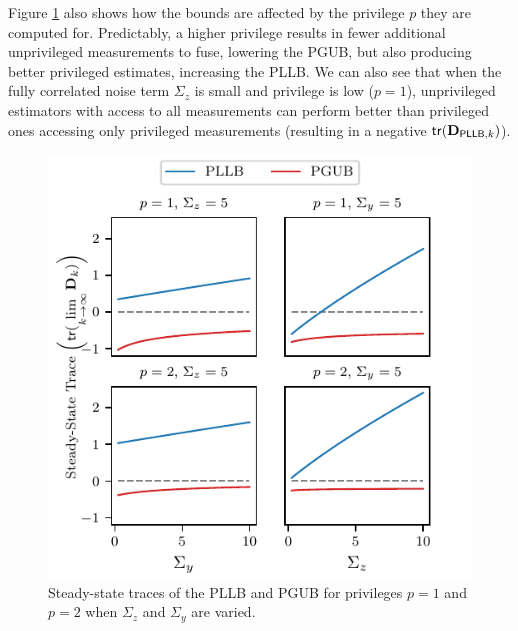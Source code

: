 Figure \ref{fig:trace_params} also shows how the bounds are affected by the privilege $p$ they are computed for. Predictably, a higher privilege results in fewer additional unprivileged measurements to fuse, lowering the PGUB, but also producing better privileged estimates, increasing the PLLB. We can also see that when the fully correlated noise term $\Sigma_z$ is small and privilege is low ($p=1$), unprivileged estimators with access to all measurements can perform better than privileged ones accessing only privileged measurements (resulting in a negative $\mathsf{tr}({{\mathbf{D}}}_{\mathsf{PLLB},k})$).
\begin{figure}[htbp]
  \centering
  \includegraphics{figures/trace_params.pdf}
  \caption{Steady-state traces of the PLLB and PGUB for privileges $p=1$ and $p=2$ when $\Sigma_z$ and $\Sigma_y$ are varied.}
  \label{fig:trace_params}
\end{figure}

% 
%                                               
%                                               
%                                               
% 

